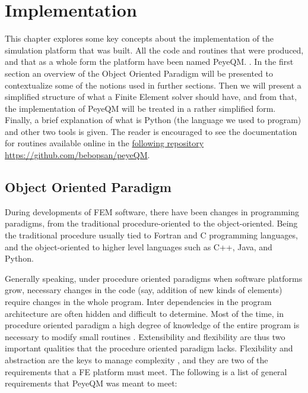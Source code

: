 \chapter{Implementation}
\label{ch:Implementation}

This chapter explores some key concepts about the implementation of the simulation platform that was built. 
All the code and routines that were produced, and that as a whole form the platform have been named PeyeQM. .   
In the first section an overview of the Object Oriented Paradigm will be presented to contextualize some of the notions used in further sections. Then we will present a simplified structure of what a Finite Element solver should have, and from that, the implementation of PeyeQM will be treated in a rather simplified form. Finally, a brief explanation of what is Python (the language we used to program) and other two tools is given. The reader is encouraged to see the documentation for routines available online in the \href{https://github.com/bebopsan/peyeQM}{following repository} \url{https://github.com/bebopsan/peyeQM}. 
  
\section{Object Oriented Paradigm}

During developments of FEM software, there have been changes in programming paradigms, from the traditional procedure-oriented to the object-oriented. Being the traditional procedure usually tied to  Fortran and C programming languages, and the object-oriented to higher level languages such as C++, Java, and Python.

Generally speaking, under procedure oriented paradigms when software platforms grow, necessary changes in the code (say, addition of new kinds of elements) require changes in the whole program. Inter dependencies  in the program architecture are often hidden and difficult to determine. Most of the time, in procedure oriented paradigm a high degree of knowledge of the entire program is necessary to modify small routines \cite{Mackerle2004}. Extensibility and flexibility are thus two important qualities that the procedure oriented paradigm lacks. 
Flexibility and abstraction are the keys to manage complexity \cite{Lage1998}, and they are two of the requirements that a FE platform must meet. The following is a list of general requirements that PeyeQM was meant to meet:

